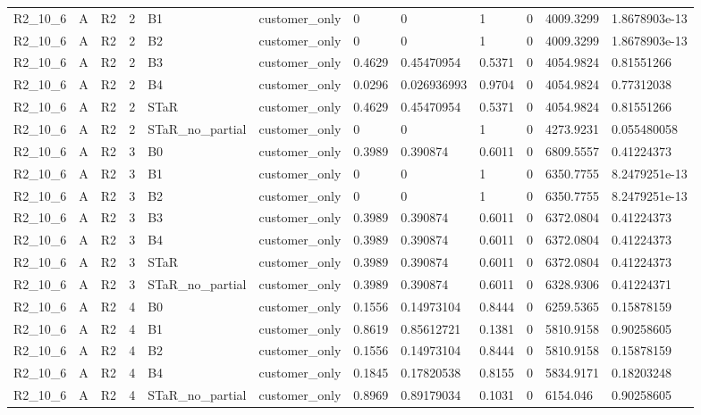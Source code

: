 \begin{longtable}{llllllllllll}
R2\_10\_6 & A & R2 & 2 & B1 & customer\_only & 0 & 0 & 1 & 0 & 4009.3299 & 1.8678903e-13 \\
R2\_10\_6 & A & R2 & 2 & B2 & customer\_only & 0 & 0 & 1 & 0 & 4009.3299 & 1.8678903e-13 \\
R2\_10\_6 & A & R2 & 2 & B3 & customer\_only & 0.4629 & 0.45470954 & 0.5371 & 0 & 4054.9824 & 0.81551266 \\
R2\_10\_6 & A & R2 & 2 & B4 & customer\_only & 0.0296 & 0.026936993 & 0.9704 & 0 & 4054.9824 & 0.77312038 \\
R2\_10\_6 & A & R2 & 2 & STaR & customer\_only & 0.4629 & 0.45470954 & 0.5371 & 0 & 4054.9824 & 0.81551266 \\
R2\_10\_6 & A & R2 & 2 & STaR\_no\_partial & customer\_only & 0 & 0 & 1 & 0 & 4273.9231 & 0.055480058 \\
R2\_10\_6 & A & R2 & 3 & B0 & customer\_only & 0.3989 & 0.390874 & 0.6011 & 0 & 6809.5557 & 0.41224373 \\
R2\_10\_6 & A & R2 & 3 & B1 & customer\_only & 0 & 0 & 1 & 0 & 6350.7755 & 8.2479251e-13 \\
R2\_10\_6 & A & R2 & 3 & B2 & customer\_only & 0 & 0 & 1 & 0 & 6350.7755 & 8.2479251e-13 \\
R2\_10\_6 & A & R2 & 3 & B3 & customer\_only & 0.3989 & 0.390874 & 0.6011 & 0 & 6372.0804 & 0.41224373 \\
R2\_10\_6 & A & R2 & 3 & B4 & customer\_only & 0.3989 & 0.390874 & 0.6011 & 0 & 6372.0804 & 0.41224373 \\
R2\_10\_6 & A & R2 & 3 & STaR & customer\_only & 0.3989 & 0.390874 & 0.6011 & 0 & 6372.0804 & 0.41224373 \\
R2\_10\_6 & A & R2 & 3 & STaR\_no\_partial & customer\_only & 0.3989 & 0.390874 & 0.6011 & 0 & 6328.9306 & 0.41224371 \\
R2\_10\_6 & A & R2 & 4 & B0 & customer\_only & 0.1556 & 0.14973104 & 0.8444 & 0 & 6259.5365 & 0.15878159 \\
R2\_10\_6 & A & R2 & 4 & B1 & customer\_only & 0.8619 & 0.85612721 & 0.1381 & 0 & 5810.9158 & 0.90258605 \\
R2\_10\_6 & A & R2 & 4 & B2 & customer\_only & 0.1556 & 0.14973104 & 0.8444 & 0 & 5810.9158 & 0.15878159 \\
R2\_10\_6 & A & R2 & 4 & B4 & customer\_only & 0.1845 & 0.17820538 & 0.8155 & 0 & 5834.9171 & 0.18203248 \\
R2\_10\_6 & A & R2 & 4 & STaR\_no\_partial & customer\_only & 0.8969 & 0.89179034 & 0.1031 & 0 & 6154.046 & 0.90258605 \\

\end{longtable}
